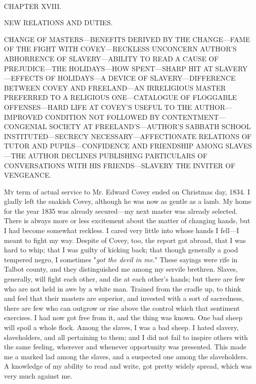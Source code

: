 {}

~

{CHAPTER XVIII.}

NEW RELATIONS AND DUTIES.

{CHANGE OF MASTERS---BENEFITS DERIVED BY THE CHANGE---FAME OF THE FIGHT
WITH COVEY---RECKLESS UNCONCERN AUTHOR'S ABHORRENCE OF SLAVERY---ABILITY
TO READ A CAUSE OF PREJUDICE---THE HOLIDAYS---HOW SPENT---SHARP HIT AT
SLAVERY---EFFECTS OF HOLIDAYS---A DEVICE OF SLAVERY---DIFFERENCE BETWEEN
COVEY AND FREELAND---AN IRRELIGIOUS MASTER PREFERRED TO A RELIGIOUS
ONE---CATALOGUE OF FLOGGABLE OFFENSES---HARD LIFE AT COVEY'S USEFUL TO
THE AUTHOR---IMPROVED CONDITION NOT FOLLOWED BY CONTENTMENT---CONGENIAL
SOCIETY AT FREELAND'S---AUTHOR'S SABBATH SCHOOL INSTITUTED---SECRECY
NECESSARY---AFFECTIONATE RELATIONS OF TUTOR AND PUPILS---CONFIDENCE AND
FRIENDSHIP AMONG SLAVES---THE AUTHOR DECLINES PUBLISHING PARTICULARS OF
CONVERSATIONS WITH HIS FRIENDS---SLAVERY THE INVITER OF VENGEANCE.}

\textsc{My} term of actual service to Mr. Edward Covey ended on
Christmas day, 1834. I gladly left the snakish Covey, although he was
now as gentle as a lamb. My home for the year 1835 was already
secured---my next master was already selected. There is always more or
less excitement about the matter of changing hands, but I had become
somewhat reckless. I cared very little into whose hands I fell---I meant
to fight my way. Despite of Covey, too, the report got abroad, that I
was hard to whip; that I was guilty of kicking back; that though
generally a good tempered negro, I sometimes "\emph{got the devil in
me}." These sayings were rife in Talbot county, and they distinguished
me among my servile brethren. Slaves, {}generally, will fight each
other, and die at each other's hands; but there are few who are not held
in awe by a white man. Trained from the cradle up, to think and feel
that their masters are superior, and invested with a sort of sacredness,
there are few who can outgrow or rise above the control which that
sentiment exercises. I had now got free from it, and the thing was
known. One bad sheep will spoil a whole flock. Among the slaves, I was a
bad sheep. I hated slavery, slaveholders, and all pertaining to them;
and I did not fail to inspire others with the same feeling, wherever and
whenever opportunity was presented. This made me a marked lad among the
slaves, and a suspected one among the slaveholders. A knowledge of my
ability to read and write, got pretty widely spread, which was very much
against me.


